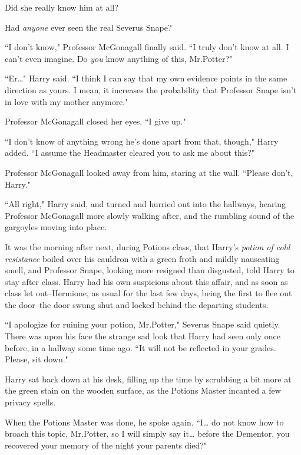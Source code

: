 Did she really know him at all?\nopagebreak

Had \emph{anyone} ever seen the real Severus Snape?

\later

``I don't know," Professor McGonagall finally said. ``I truly don't know at all. I can't even imagine. Do \emph{you} know anything of this, Mr.\?Potter?"

``Er{\ldots}" Harry said. ``I think I can say that my own evidence points in the same direction as yours. I mean, it increases the probability that Professor Snape isn't in love with my mother anymore."

Professor McGonagall closed her eyes. ``I give up."

``I don't know of anything wrong he's done apart from that, though," Harry added. ``I assume the Headmaster cleared you to ask me about this?"

Professor McGonagall looked away from him, staring at the wall. ``Please don't, Harry."

``All right," Harry said, and turned and hurried out into the hallways, hearing Professor McGonagall more slowly walking after, and the rumbling sound of the gargoyles moving into place.

\later

It was the morning after next, during Potions class, that Harry's \emph{potion of cold resistance} boiled over his cauldron with a green froth and mildly nauseating smell, and Professor Snape, looking more resigned than disgusted, told Harry to stay after class. Harry had his own suspicions about this affair, and as soon as class let out\---Hermione, as usual for the last few days, being the first to flee out the door\---the door swung shut and locked behind the departing students.

``I apologize for ruining your potion, Mr.\?Potter," Severus Snape said quietly. There was upon his face the strange sad look that Harry had seen only once before, in a hallway some time ago. ``It will not be reflected in your grades. Please, sit down."

Harry sat back down at his desk, filling up the time by scrubbing a bit more at the green stain on the wooden surface, as the Potions Master incanted a few privacy spells.

When the Potions Master was done, he spoke again. ``I{\ldots} do not know how to broach this topic, Mr.\?Potter, so I will simply say it{\ldots} before the Dementor, you recovered your memory of the night your parents died?"

